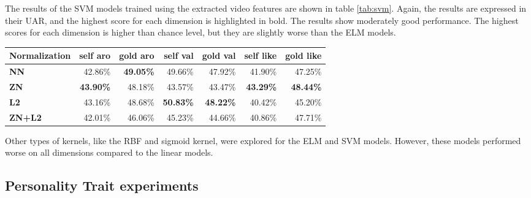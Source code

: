 The results of the SVM models trained using the extracted video features are shown in table \ref{tab:svm}. Again, the results are expressed in their UAR, and the highest score for each dimension is highlighted in bold. The results show moderately good performance. The highest scores for each dimension is higher than chance level, but they are slightly worse than the ELM models. 

\begin{table*}[h]
\begin{tabular}{|l|r|r|r|r|r|r|}
\hline
\rowcolor[HTML]{C0C0C0} 
\textbf{Normalization} & \multicolumn{1}{P{1.5cm}|}{\cellcolor[HTML]{C0C0C0}\textbf{self aro}} & \multicolumn{1}{P{1.5cm}|}{\cellcolor[HTML]{C0C0C0}\textbf{gold aro}} & \multicolumn{1}{P{1.5cm}|}{\cellcolor[HTML]{C0C0C0}\textbf{self val}} & \multicolumn{1}{P{1.5cm}|}{\cellcolor[HTML]{C0C0C0}\textbf{gold val}} & \multicolumn{1}{P{1.5cm}|}{\cellcolor[HTML]{C0C0C0}\textbf{self like}} & \multicolumn{1}{P{1.5cm}|}{\cellcolor[HTML]{C0C0C0}\textbf{gold like}} \\ \hline
\textbf{NN} & \cellcolor[HTML]{FFE1E1}42.86\% & \cellcolor[HTML]{FF0000}\textbf{49.05\%} & \cellcolor[HTML]{FFDD7F}49.66\% & \cellcolor[HTML]{FFE7A3}47.92\% & \cellcolor[HTML]{E1F3EA}41.90\% & \cellcolor[HTML]{70C69C}47.25\%  \\ \hline
\textbf{ZN} & \cellcolor[HTML]{FFBBBB}\textbf{43.90\%} & \cellcolor[HTML]{FF2020}48.18\% & \cellcolor[HTML]{FFFFFD}43.57\% & \cellcolor[HTML]{FFFFFF}43.47\% & \cellcolor[HTML]{C3E7D6}\textbf{43.29\%} & \cellcolor[HTML]{57BB8A}\textbf{48.44\%}  \\ \hline
\textbf{L2} & \cellcolor[HTML]{FFD6D6}43.16\% & \cellcolor[HTML]{FF0E0E}48.68\% & \cellcolor[HTML]{FFD666}\textbf{50.83\%} & \cellcolor[HTML]{FFE59D}\textbf{48.22\%} & \cellcolor[HTML]{FFFFFF}40.42\% & \cellcolor[HTML]{9BD7BA}45.20\% \\ \hline
\textbf{ZN+L2} & \cellcolor[HTML]{FFFFFF}42.01\% & \cellcolor[HTML]{FF6D6D}46.06\% & \cellcolor[HTML]{FFF6DB}45.23\% & \cellcolor[HTML]{FFF9E7}44.66\% & \cellcolor[HTML]{F6FCF9}40.86\% & \cellcolor[HTML]{67C295}47.71\%  \\ \hline
\end{tabular}
\caption{Support Vector Machine model performance results expressed in UAR. "aro": arousal, "val": valence, "like": likeability.}
\label{tab:svm}
\end{table*}

Other types of kernels, like the RBF and sigmoid kernel, were explored for the ELM and SVM models. However, these models performed worse on all dimensions compared to the linear models. 

\subsection{Personality Trait experiments}